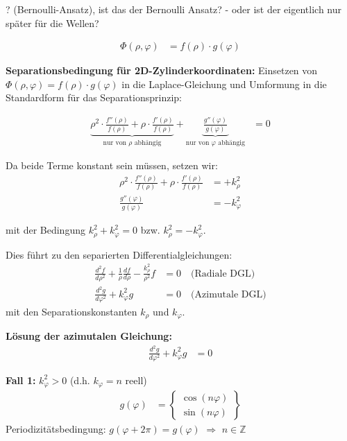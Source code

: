 ? (Bernoulli-Ansatz), ist das der Bernoulli Ansatz? - oder ist der eigentlich nur später für die Wellen?


\begin{align}
\Phi(\rho,\varphi) &= f(\rho) \cdot g(\varphi)
\end{align}

\textbf{Separationsbedingung für 2D-Zylinderkoordinaten:}
Einsetzen von $\Phi(\rho,\varphi) = f(\rho) \cdot g(\varphi)$ in die Laplace-Gleichung und Umformung in die Standardform für das Separationsprinzip:

\begin{align}
\underbrace{\rho^2 \cdot \frac{f''(\rho)}{f(\rho)} + \rho \cdot \frac{f'(\rho)}{f(\rho)}}_{\text{nur von } \rho \text{ abhängig}} + \underbrace{\frac{g''(\varphi)}{g(\varphi)}}_{\text{nur von } \varphi \text{ abhängig}} &= 0
\end{align}

Da beide Terme konstant sein müssen, setzen wir:
\begin{align}
\rho^2 \cdot \frac{f''(\rho)}{f(\rho)} + \rho \cdot \frac{f'(\rho)}{f(\rho)} &= +k_\rho^2\\
\frac{g''(\varphi)}{g(\varphi)} &= -k_\varphi^2
\end{align}

mit der Bedingung $k_\rho^2 + k_\varphi^2 = 0$ bzw. $k_\rho^2 = -k_\varphi^2$.

Dies führt zu den separierten Differentialgleichungen:
\begin{align}
\frac{d^2 f}{d\rho^2} + \frac{1}{\rho}\frac{df}{d\rho} - \frac{k_\rho^2}{\rho^2}f &= 0 \quad \text{(Radiale DGL)}\\
\frac{d^2 g}{d\varphi^2} + k_\varphi^2 g &= 0 \quad \text{(Azimutale DGL)}
\end{align}
mit den Separationskonstanten $k_\rho$ und $k_\varphi$.

\textbf{Lösung der azimutalen Gleichung:}
\begin{align}
\frac{d^2 g}{d\varphi^2} + k_\varphi^2 g &= 0
\end{align}

\textbf{Fall 1:} $k_\varphi^2 > 0$ (d.h. $k_\varphi = n$ reell)
\begin{align}
g(\varphi) &= \begin{Bmatrix} \cos(n\varphi) \\ \sin(n\varphi) \end{Bmatrix}
\end{align}
Periodizitätsbedingung: $g(\varphi + 2\pi) = g(\varphi)$ $\Rightarrow$ $n \in \mathbb{Z}$

